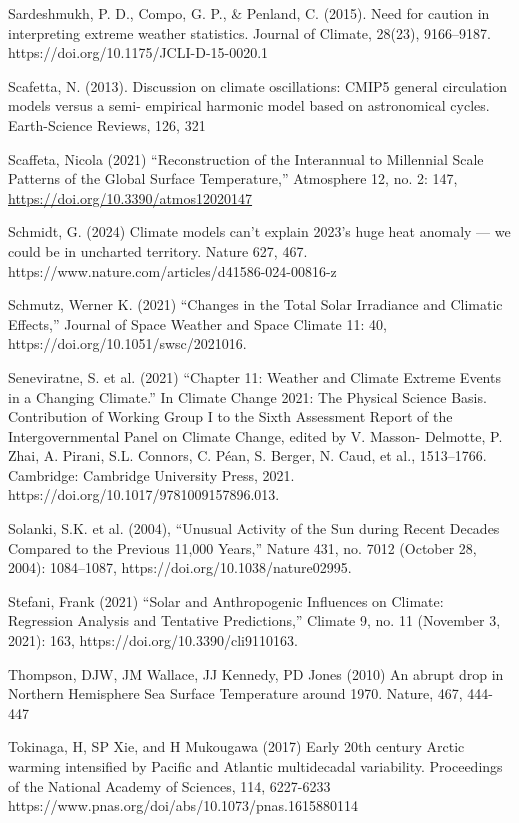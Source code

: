 \documentclass[12pt,paper=a4,DIV=12,parskip=never,chapterprefix=false,headings=standardclasses]{scrreprt}
\begin{document}
Sardeshmukh, P. D., Compo, G. P., \& Penland, C. (2015). Need for caution in interpreting extreme
weather statistics. Journal of Climate, 28(23), 9166–9187. https://doi.org/10.1175/JCLI-D-15-0020.1

Scafetta, N. (2013). Discussion on climate oscillations: CMIP5 general circulation models versus a semi-
empirical harmonic model based on astronomical cycles. Earth-Science Reviews, 126, 321

Scaffeta, Nicola (2021) “Reconstruction of the Interannual to Millennial Scale Patterns of the Global
Surface Temperature,” Atmosphere 12, no. 2: 147, \url{https://doi.org/10.3390/atmos12020147}

Schmidt, G. (2024) Climate models can’t explain 2023’s huge heat anomaly — we could be in uncharted
territory. Nature 627, 467. https://www.nature.com/articles/d41586-024-00816-z

Schmutz, Werner K. (2021) “Changes in the Total Solar Irradiance and Climatic Effects,” Journal of
Space Weather and Space Climate 11: 40, https://doi.org/10.1051/swsc/2021016.

Seneviratne, S. et al. (2021) “Chapter 11: Weather and Climate Extreme Events in a Changing Climate.”
In Climate Change 2021: The Physical Science Basis. Contribution of Working Group I to the Sixth
Assessment Report of the Intergovernmental Panel on Climate Change, edited by V. Masson-
Delmotte, P. Zhai, A. Pirani, S.L. Connors, C. Péan, S. Berger, N. Caud, et al., 1513–1766.
Cambridge: Cambridge University Press, 2021. https://doi.org/10.1017/9781009157896.013.

Solanki, S.K. et al. (2004), “Unusual Activity of the Sun during Recent Decades Compared to the
Previous 11,000 Years,” Nature 431, no. 7012 (October 28, 2004): 1084–1087,
https://doi.org/10.1038/nature02995.

Stefani, Frank (2021) “Solar and Anthropogenic Influences on Climate: Regression Analysis and
Tentative Predictions,” Climate 9, no. 11 (November 3, 2021): 163,
https://doi.org/10.3390/cli9110163.

Thompson, DJW, JM Wallace, JJ Kennedy, PD Jones (2010) An abrupt drop in Northern Hemisphere Sea
Surface Temperature around 1970. Nature, 467, 444-447

Tokinaga, H, SP Xie, and H Mukougawa (2017) Early 20th century Arctic warming intensified by
Pacific and Atlantic multidecadal variability. Proceedings of the National Academy of Sciences, 114,
6227-6233 https://www.pnas.org/doi/abs/10.1073/pnas.1615880114
\end{document}
